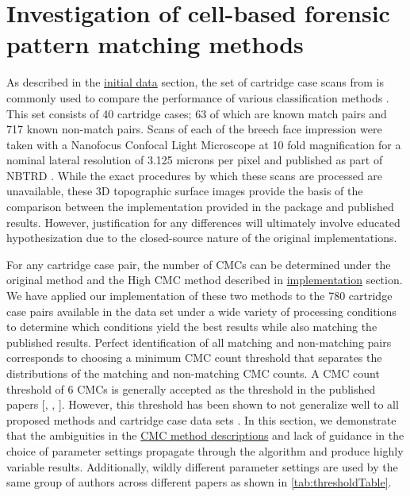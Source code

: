 \hypertarget{investigation}{%
\section{Investigation of cell-based forensic pattern matching
methods}\label{investigation}}

As described in the \protect\hyperlink{initialData}{initial data}
section, the set of cartridge case scans from
\citet{fadul_empirical_2011} is commonly used to compare the performance
of various classification methods
\citep{song_3d_2014, tong_improved_2015, chen_convergence_2017}. This
set consists of 40 cartridge cases; 63 of which are known match pairs
and 717 known non-match pairs. Scans of each of the breech face
impression were taken with a Nanofocus Confocal Light Microscope at 10
fold magnification for a nominal lateral resolution of 3.125 microns per
pixel and published as part of NBTRD \citep{nbtrd}. While the exact
procedures by which these scans are processed are unavailable, these 3D
topographic surface images provide the basis of the comparison between
the implementation provided in the  package and published
results. However, justification for any differences will ultimately
involve educated hypothesization due to the closed-source nature of the
original implementations.

For any cartridge case pair, the number of CMCs can be determined under
the original method and the High CMC method described in
\protect\hyperlink{implementation}{implementation} section. We have
applied our implementation of these two methods to the 780 cartridge
case pairs available in the \citet{fadul_empirical_2011} data set under
a wide variety of processing conditions to determine which conditions
yield the best results while also matching the published results.
Perfect identification of all matching and non-matching pairs
corresponds to choosing a minimum CMC count threshold that separates the
distributions of the matching and non-matching CMC counts. A CMC count
threshold of 6 CMCs is generally accepted as the threshold in the
published papers {[}\citet{tong_improved_2015},
\citet{song_estimating_2018}, \citet{song_proposed_2013}{]}. However,
this threshold has been shown to not generalize well to all proposed
methods and cartridge case data sets \citep{chen_convergence_2017}. In
this section, we demonstrate that the ambiguities in the
\href{cmcMethod}{CMC method descriptions} and lack of guidance in the
choice of parameter settings propagate through the algorithm and produce
highly variable results. Additionally, wildly different parameter
settings are used by the same group of authors across different papers
as shown in \autoref{tab:thresholdTable}.

